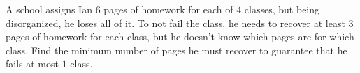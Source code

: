 A school assigns Ian $6$ pages of homework for each of $4$ classes, but being disorganized, he loses all of it. To not fail the class, he needs to recover at least $3$ pages of homework for each class, but he doesn't know which pages are for which class. Find the minimum number of pages he must recover to guarantee that he fails at most $1$ class.
